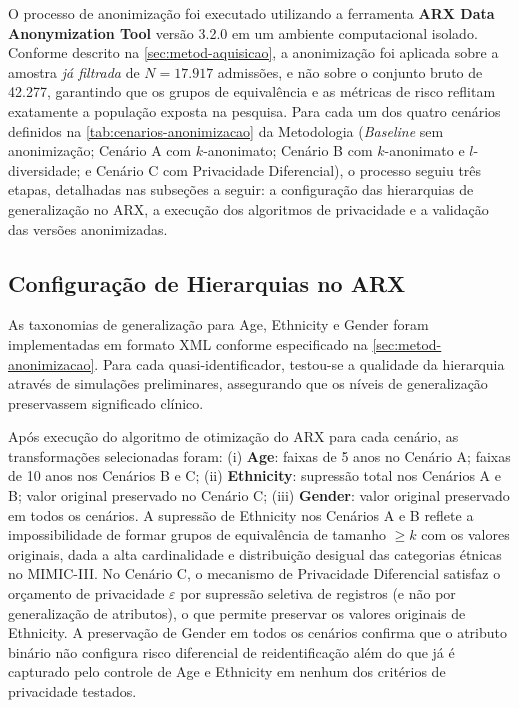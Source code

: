 O processo de anonimização foi executado utilizando a ferramenta \textbf{ARX Data Anonymization Tool} versão 3.2.0 em um ambiente computacional isolado. Conforme descrito na \autoref{sec:metod-aquisicao}, a anonimização foi aplicada sobre a amostra \textit{já filtrada} de $N = 17.917$ admissões, e não sobre o conjunto bruto de 42.277, garantindo que os grupos de equivalência e as métricas de risco reflitam exatamente a população exposta na pesquisa. Para cada um dos quatro cenários definidos na \autoref{tab:cenarios-anonimizacao} da Metodologia (\textit{Baseline} sem anonimização; Cenário A com $k$-anonimato; Cenário B com $k$-anonimato e $l$-diversidade; e Cenário C com Privacidade Diferencial), o processo seguiu três etapas, detalhadas nas subseções a seguir: a configuração das hierarquias de generalização no ARX, a execução dos algoritmos de privacidade e a validação das versões anonimizadas.

\subsection{Configuração de Hierarquias no ARX}
As taxonomias de generalização para Age, Ethnicity e Gender foram implementadas em formato XML conforme especificado na \autoref{sec:metod-anonimizacao}. Para cada quasi-identificador, testou-se a qualidade da hierarquia através de simulações preliminares, assegurando que os níveis de generalização preservassem significado clínico.

Após execução do algoritmo de otimização do ARX para cada cenário, as transformações selecionadas foram: (i) \textbf{Age}: faixas de 5 anos no Cenário A; faixas de 10 anos nos Cenários B e C; (ii) \textbf{Ethnicity}: supressão total nos Cenários A e B; valor original preservado no Cenário C; (iii) \textbf{Gender}: valor original preservado em todos os cenários. A supressão de Ethnicity nos Cenários A e B reflete a impossibilidade de formar grupos de equivalência de tamanho $\geq k$ com os valores originais, dada a alta cardinalidade e distribuição desigual das categorias étnicas no MIMIC-III. No Cenário C, o mecanismo de Privacidade Diferencial satisfaz o orçamento de privacidade $\varepsilon$ por supressão seletiva de registros (e não por generalização de atributos), o que permite preservar os valores originais de Ethnicity. A preservação de Gender em todos os cenários confirma que o atributo binário não configura risco diferencial de reidentificação além do que já é capturado pelo controle de Age e Ethnicity em nenhum dos critérios de privacidade testados.

